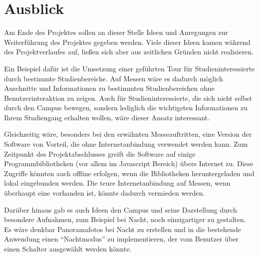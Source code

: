 \section{Ausblick}
\label{sec:Ausblick}

Am Ende des Projektes sollen an dieser Stelle Ideen und Anregungen zur Weiterführung des Projektes gegeben werden. Viele dieser Ideen kamen während des Projektverlaufes auf, ließen sich aber aus zeitlichen Gründen nicht realisieren.

Ein Beispiel dafür ist die Umsetzung einer geführten Tour für Studieninteressierte durch bestimmte Studienbereiche. Auf Messen wäre es dadurch möglich Auschnitte und Informationen zu bestimmten Studienbereichen ohne Benutzerinteraktion zu zeigen. Auch für Studieninteressierte, die sich nicht selbst durch den Campus bewegen, sondern lediglich die wichtigsten Informationen zu Ihrem Studiengang erhalten wollen, wäre dieser Ansatz interessant.

Gleichzeitig wäre, besonders bei den erwähnten Messeauftritten, eine Version der Software von Vorteil, die ohne Internetanbindung verwendet werden kann. Zum Zeitpunkt des Projektabschlusses greift die Software auf einige Programmbibliotheken (vor allem im Javascript Bereich) übers Internet zu. Diese Zugriffe könnten auch offline erfolgen, wenn die Bibliotheken heruntergeladen und lokal eingebunden werden. Die teure Internetanbindung auf Messen, wenn überhaupt eine vorhanden ist, könnte dadurch vermieden werden.

Darüber hinaus gab es auch Ideen den Campus und seine Darstellung durch besondere Aufnahmen, zum Beispiel bei Nacht, noch einzigartiger zu gestalten. Es wäre denkbar Panoramafotos bei Nacht zu erstellen und in die bestehende Anwendung einen "`Nachtmodus"' zu implementieren, der vom Benutzer über einen Schalter ausgewählt werden könnte.